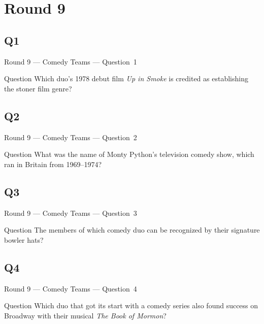 \documentclass[11pt]{beamer}
\begin{document}
\section{Round 9}
\subsection*{Q1}
\begin{frame}[t]{Round 9 --- Comedy Teams --- \mbox{Question 1}}
\vspace{-0.5em}
\begin{block}{Question}
Which duo's 1978 debut film \emph{Up in Smoke} is credited as establishing the stoner film genre?
\end{block}
\end{frame}
\subsection*{Q2}
\begin{frame}[t]{Round 9 --- Comedy Teams --- \mbox{Question 2}}
\vspace{-0.5em}
\begin{block}{Question}
What was the name of Monty Python's television comedy show, which ran in Britain from 1969--1974?
\end{block}
\end{frame}
\subsection*{Q3}
\begin{frame}[t]{Round 9 --- Comedy Teams --- \mbox{Question 3}}
\vspace{-0.5em}
\begin{block}{Question}
The members of which comedy duo can be recognized by their signature bowler hats?
\end{block}
\end{frame}
\subsection*{Q4}
\begin{frame}[t]{Round 9 --- Comedy Teams --- \mbox{Question 4}}
\vspace{-0.5em}
\begin{block}{Question}
Which duo that got its start with a comedy series also found success on Broadway with their musical  \emph{The Book of Mormon}?
\end{block}
\end{frame}
\end{document}
